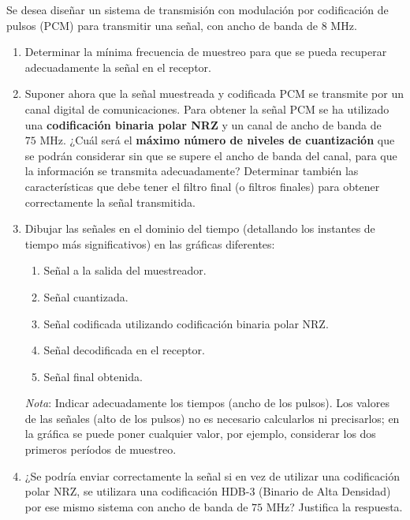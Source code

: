 \newpage
\begin{problema}
Se desea diseñar un sistema de transmisión con modulación por codificación de pulsos (PCM) para transmitir una señal, con ancho de banda de $8\text{ MHz}$.

\begin{enumerate}[label=\alph*)]
    \item Determinar la mínima frecuencia de muestreo para que se pueda recuperar adecuadamente la señal en el receptor.
    \item Suponer ahora que la señal muestreada y codificada PCM se transmite por un canal digital de comunicaciones. Para obtener la señal PCM se ha utilizado una \textbf{codificación binaria polar NRZ} y un canal de ancho de banda de $75\text{ MHz}$. ¿Cuál será el \textbf{máximo número de niveles de cuantización} que se podrán considerar sin que se supere el ancho de banda del canal, para que la información se transmita adecuadamente? Determinar también las características que debe tener el filtro final (o filtros finales) para obtener correctamente la señal transmitida.
    \item Dibujar las señales en el dominio del tiempo (detallando los instantes de tiempo más significativos) en las gráficas diferentes:
    \begin{enumerate}[label=\alph*.]
        \item Señal a la salida del muestreador.
        \item Señal cuantizada.
        \item Señal codificada utilizando codificación binaria polar NRZ.
        \item Señal decodificada en el receptor.
        \item Señal final obtenida.
    \end{enumerate}
    \textit{Nota}: Indicar adecuadamente los tiempos (ancho de los pulsos). Los valores de las señales (alto de los pulsos) no es necesario calcularlos ni precisarlos; en la gráfica se puede poner cualquier valor, por ejemplo, considerar los dos primeros períodos de muestreo.
    \item ¿Se podría enviar correctamente la señal si en vez de utilizar una codificación polar NRZ, se utilizara una codificación HDB-3 (Binario de Alta Densidad) por ese mismo sistema con ancho de banda de $75\text{ MHz}$? Justifica la respuesta.
\end{enumerate}
\end{problema}

